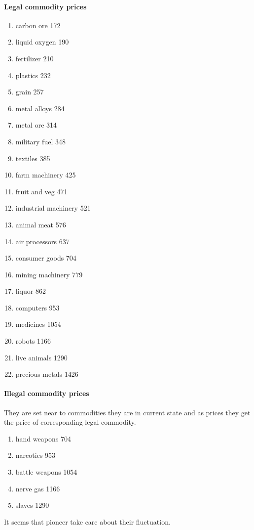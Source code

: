 \documentclass[]{article}
\begin{document}
\paragraph{Legal commodity prices}
\begin{enumerate}
\item 	carbon ore	172
\item 	liquid oxygen	190
\item 	fertilizer	210
\item 	plastics	232
\item 	grain	257
\item 	metal alloys	284
\item 	metal ore	314
\item 	military fuel	348
\item 	textiles	385
\item 	farm machinery	425
\item 	fruit and veg	471
\item 	industrial machinery	521
\item 	animal meat	576
\item 	air processors	637
\item 	consumer goods	704
\item 	mining machinery	779
\item 	liquor	862
\item 	computers	953
\item 	medicines	1054
\item 	robots	1166
\item 	live animals	1290
\item 	precious metals	1426	
\end{enumerate}
\paragraph{Illegal commodity prices}
They are set near to commodities they are in current state and as prices they get the price of corresponding legal commodity. 
\begin{enumerate}
	\item hand weapons 704
	\item narcotics 953
	\item battle weapons 1054
	\item nerve gas 1166
	\item slaves 1290
\end{enumerate}
It seems that pioneer take care about their fluctuation.
\end{document}
